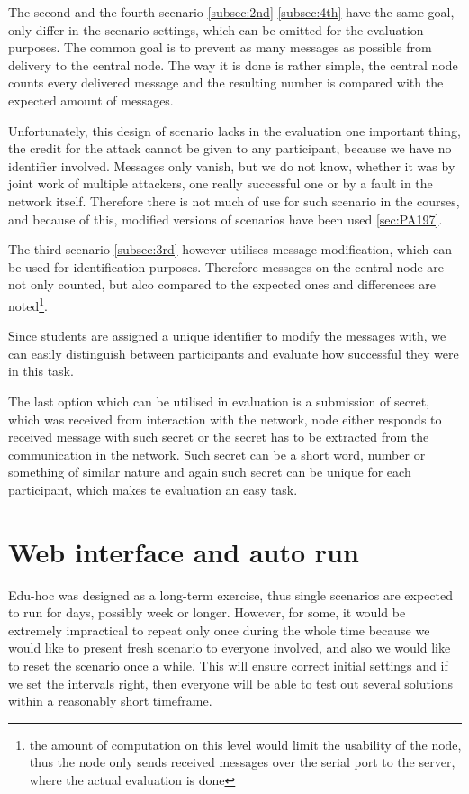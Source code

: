 \documentclass[
  print, %
  table,   %
  nolof,     %
  nolot,     %
           oneside
]{fithesis3}
\begin{document}
  The second and the fourth scenario \ref{subsec:2nd} \ref{subsec:4th} have the same goal, only differ in the scenario settings, which can be omitted for the evaluation purposes. The common goal is to prevent as many messages as possible from delivery to the central node. The way it is done is rather simple, the central node counts every delivered message and the resulting number is compared with the expected amount of messages.

  Unfortunately, this design of scenario lacks in the evaluation one important thing, the credit for the attack cannot be given to any participant, because we have no identifier involved. Messages only vanish, but we do not know, whether it was by joint work of multiple attackers, one really successful one or by a fault in the network itself. Therefore there is not much of use for such scenario in the courses, and because of this, modified versions of scenarios have been used \ref{sec:PA197}.

  The third scenario \ref{subsec:3rd} however utilises message modification, which can be used for identification purposes. Therefore messages on the central node are not only counted, but alco compared to the expected ones and differences are noted\footnote{the amount of computation on this level would limit the usability of the node, thus the node only sends received messages over the serial port to the server, where the actual evaluation is done}.

  Since students are assigned a unique identifier to modify the messages with, we can easily distinguish between participants and evaluate how successful they were in this task.

  The last option which can be utilised in evaluation is a submission of secret, which was received from interaction with the network, node either responds to received message with such secret or the secret has to be extracted from the communication in the network. Such secret can be a short word, number or something of similar nature and again such secret can be unique for each participant, which makes te evaluation an easy task.
  \section{Web interface and auto run}
  Edu-hoc was designed as a long-term exercise, thus single scenarios are expected to run for days, possibly week or longer. However, for some, it would be extremely impractical to repeat only once during the whole time because we would like to present fresh scenario to everyone involved,  and also we would like to reset the scenario once a while. This will ensure correct initial settings and if we set the intervals right, then everyone will be able to test out several solutions within a reasonably short timeframe.
\end{document}
